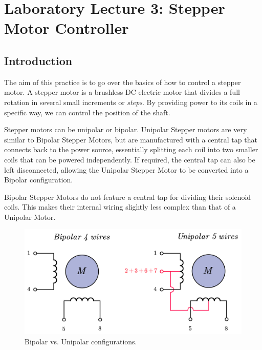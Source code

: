 \section{Laboratory Lecture 3: Stepper Motor Controller}

\subsection{Introduction}

The aim of this practice is to go over the basics of how to control a stepper motor. A stepper motor is a brushless DC electric motor that divides a full rotation in several small increments or \textit{steps}. By providing power to its coils in a specific way, we can control the position of the shaft.\medskip

Stepper motors can be unipolar or bipolar. Unipolar Stepper motors are very similar to Bipolar Stepper Motors, but are manufactured with a central tap that connects back to the power source, essentially splitting each coil into two smaller coils that can be powered independently. If required, the central tap can also be left disconnected, allowing the Unipolar Stepper Motor to be converted into a Bipolar configuration.\medskip

Bipolar Stepper Motors do not feature a central tap for dividing their solenoid coils. This makes their internal wiring slightly less complex than that of a Unipolar Motor.

\vspace{0.3cm}

\begin{figure}[H]
    \centering
    \includegraphics[scale = 0.24]{Graphics/Practice 3/GRAPHICS/STEPPER_TYPES.pdf}
    \caption{Bipolar vs. Unipolar configurations.}
    \label{fig:STEPPER_TYPE}
\end{figure}

\clearpage

